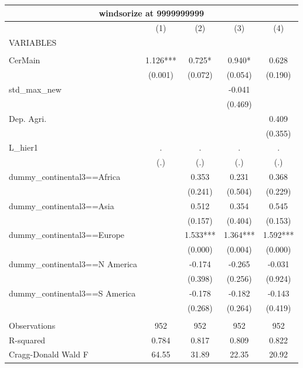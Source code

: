 \documentclass[12pt,a4paper]{article}
\begin{document}
\begin{tabular}{lcccc}
\multicolumn{5}{c}{windsorize at 9999999999} \\ \hline
 & (1) & (2) & (3) & (4) \\
VARIABLES &  &  &  &  \\ \hline
 &  &  &  &  \\
CerMain & 1.126*** & 0.725* & 0.940* & 0.628 \\
 & (0.001) & (0.072) & (0.054) & (0.190) \\
std\_max\_new &  &  & -0.041 &  \\
 &  &  & (0.469) &  \\
Dep. Agri. &  &  &  & 0.409 \\
 &  &  &  & (0.355) \\
L\_hier1 & . & . & . & . \\
 & (.) & (.) & (.) & (.) \\
dummy\_continental3==Africa &  & 0.353 & 0.231 & 0.368 \\
 &  & (0.241) & (0.504) & (0.229) \\
dummy\_continental3==Asia &  & 0.512 & 0.354 & 0.545 \\
 &  & (0.157) & (0.404) & (0.153) \\
dummy\_continental3==Europe &  & 1.533*** & 1.364*** & 1.592*** \\
 &  & (0.000) & (0.004) & (0.000) \\
dummy\_continental3==N America &  & -0.174 & -0.265 & -0.031 \\
 &  & (0.398) & (0.256) & (0.924) \\
dummy\_continental3==S America &  & -0.178 & -0.182 & -0.143 \\
 &  & (0.268) & (0.264) & (0.419) \\
 &  &  &  &  \\
Observations & 952 & 952 & 952 & 952 \\
R-squared & 0.784 & 0.817 & 0.809 & 0.822 \\
 Cragg-Donald Wald F & 64.55 & 31.89 & 22.35 & 20.92 \\ \hline
\end{tabular}
\end{document}
